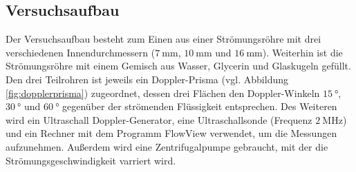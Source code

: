 \subsection{Versuchsaufbau}
\label{sec:Versuchsaufbau}
Der Versuchsaufbau besteht zum Einen aus einer Strömungsröhre mit drei verschiedenen 
Innendurchmessern ($\SI{7}{\milli\meter}$, $\SI{10}{\milli\meter}$ und $\SI{16}{\milli\meter}$).
Weiterhin ist die Strömungsröhre mit einem Gemisch aus Wasser, Glycerin und Glaskugeln gefüllt.
Den drei Teilrohren ist jeweils ein Doppler-Prisma (vgl. Abbildung
\ref{fig:dopplerprisma}) zugeordnet, dessen drei Flächen den Doppler-Winkeln $\SI{15}{\degree}$,
$\SI{30}{\degree}$ und $\SI{60}{\degree}$ gegenüber der strömenden Flüssigkeit entsprechen. 
Des Weiteren wird ein Ultraschall Doppler-Generator, eine Ultraschallsonde (Frequenz 
$\SI{2}{\mega\hertz}$) und ein Rechner mit dem Programm FlowView verwendet, um die Messungen
aufzunehmen. Außerdem wird eine Zentrifugalpumpe gebraucht, mit der die
Strömungsgeschwindigkeit
varriert wird. 
